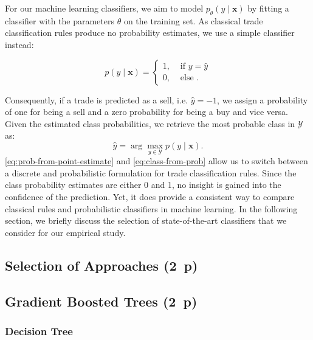 For our machine learning classifiers, we aim to model $p_{\theta}(y \mid \boldsymbol{x})$ by fitting a classifier with the parameters $\theta$ on the training set. As classical trade classification rules produce no probability estimates, we use a simple classifier instead:

\begin{equation}
    p(y\mid \boldsymbol{x})= \begin{cases}1, & \text { if } y=\hat{y} \\ 0, & \text { else }.\end{cases}
    \label{eq:prob-from-point-estimate}
\end{equation}

Consequently, if a trade is predicted as a sell, i.e. $\hat{y} = -1$,  we assign a probability of one for being a sell and a zero probability for being a buy and vice versa. Given the estimated class probabilities, we retrieve the most probable class in $\mathcal{Y}$ as:
\begin{equation}
    \hat{y}=\arg\max_{y \in \mathcal{Y}} p(y \mid \boldsymbol{x}).
    \label{eq:class-from-prob}
\end{equation}
\cref{eq:prob-from-point-estimate} and \cref{eq:class-from-prob} allow us to switch between a discrete and probabilistic formulation for trade classification rules. Since the class probability estimates are either 0
and 1, no insight is gained into the confidence of the prediction. Yet, it does provide a consistent way to compare classical rules and probabilistic classifiers in machine learning. In the following section, we briefly discuss the selection of state-of-the-art classifiers that we consider for our empirical study.


\subsection{Selection of Approaches (2~p)}\label{sec:selection-of-approaches}

\subsection{Gradient Boosted Trees (2~p)}\label{sec:gradient-boosted-trees}

\subsubsection{Decision Tree}\label{sec:decision-tree}

